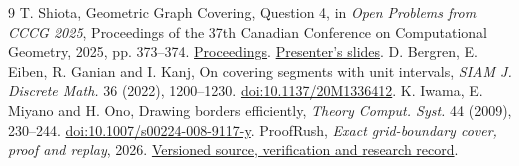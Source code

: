 \documentclass[11pt]{article}
\begin{document}
\small
\begin{thebibliography}{9}
\setlength{\itemsep}{1pt}
 T. Shiota, Geometric Graph Covering, Question 4, in \emph{Open Problems from CCCG 2025}, Proceedings of the 37th Canadian Conference on Computational Geometry, 2025, pp. 373--374. \href{https://cccg-wads-2025.eecs.yorku.ca/CCCG_2025_Open_Problems.pdf}{Proceedings}. \href{https://shiotatakumi.github.io/MyPage/download/250814-CCCG-2025-Open-Problem.pptx}{Presenter's slides}.
 D. Bergren, E. Eiben, R. Ganian and I. Kanj, On covering segments with unit intervals, \emph{SIAM J. Discrete Math.} 36 (2022), 1200--1230. \href{https://doi.org/10.1137/20M1336412}{doi:10.1137/20M1336412}.
 K. Iwama, E. Miyano and H. Ono, Drawing borders efficiently, \emph{Theory Comput. Syst.} 44 (2009), 230--244. \href{https://doi.org/10.1007/s00224-008-9117-y}{doi:10.1007/s00224-008-9117-y}.
 ProofRush, \emph{Exact grid-boundary cover, proof and replay}, 2026. \href{https://github.com/yoshi0703/ProofRush/releases/tag/shiota-square-cover-v1.0.0}{Versioned source, verification and research record}.
\end{thebibliography}
\end{document}
